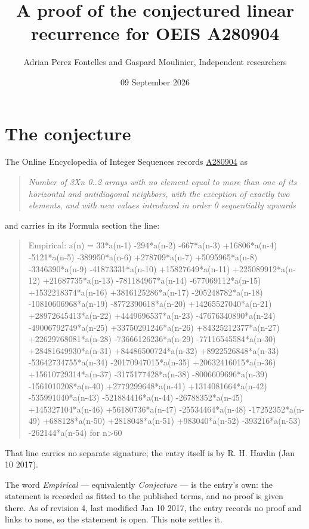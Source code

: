 \documentclass[11pt]{article}
\title{A proof of the conjectured linear recurrence for OEIS A280904}
\author{Adrian Perez Fontelles and Gaspard Moulinier, Independent researchers}
\date{09 September 2026}
\theoremstyle{definition}
\begin{document}
\maketitle
\section{The conjecture}

The Online Encyclopedia of Integer Sequences records \href{https://oeis.org/A280904}{A280904} as

\begin{quote}\itshape Number of 3Xn 0..2 arrays with no element equal to more than one of its horizontal and antidiagonal neighbors, with the exception of exactly two elements, and with new values introduced in order 0 sequentially upwards\end{quote}

and carries in its Formula section the line:

\begin{quote}\ttfamily Empirical: a(n) = 33*a(n-1) -294*a(n-2) -667*a(n-3) +16806*a(n-4) -5121*a(n-5) -389950*a(n-6) +278709*a(n-7) +5095965*a(n-8) -3346390*a(n-9) -41873331*a(n-10) +15827649*a(n-11) +225089912*a(n-12) +21687735*a(n-13) -781184967*a(n-14) -677069112*a(n-15) +1532218374*a(n-16) +3816125286*a(n-17) -205248782*a(n-18) -10810606968*a(n-19) -8772390618*a(n-20) +14265527040*a(n-21) +28972645413*a(n-22) +4449696537*a(n-23) -47676340890*a(n-24) -49006792749*a(n-25) +33750291246*a(n-26) +84325212377*a(n-27) +22629768081*a(n-28) -73666126236*a(n-29) -77116545584*a(n-30) +28481649930*a(n-31) +84486500724*a(n-32) +8922526848*a(n-33) -53642734755*a(n-34) -20170947015*a(n-35) +20632416015*a(n-36) +15610729314*a(n-37) -3175177428*a(n-38) -8006609696*a(n-39) -1561010208*a(n-40) +2779299648*a(n-41) +1314081664*a(n-42) -535991040*a(n-43) -521884416*a(n-44) -26788352*a(n-45) +145327104*a(n-46) +56180736*a(n-47) -25534464*a(n-48) -17252352*a(n-49) +688128*a(n-50) +2818048*a(n-51) +983040*a(n-52) -393216*a(n-53) -262144*a(n-54) for n>60\end{quote}

That line carries no separate signature; the entry itself is by R. H. Hardin (Jan 10 2017).

The word {\itshape Empirical} --- equivalently {\itshape Conjecture} --- is the entry's own: the statement is recorded as fitted to the published terms, and no proof is given there. As of revision 4, last modified Jan 10 2017, the entry records no proof and links to none, so the statement is open. This note settles it.
\end{document}
